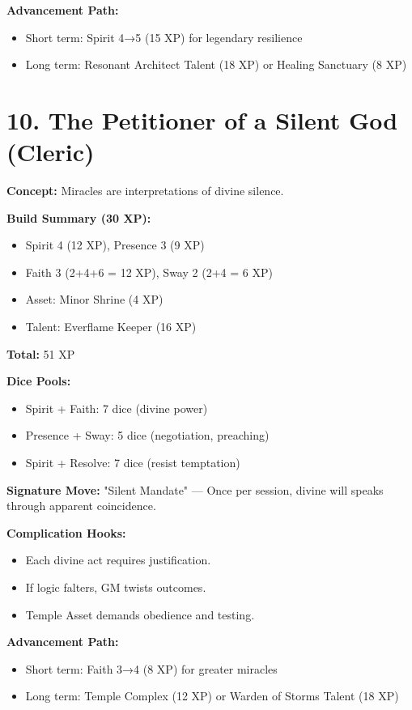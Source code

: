 \textbf{Advancement Path:}
\begin{itemize}
  \item Short term: Spirit 4→5 (15 XP) for legendary resilience
  \item Long term: Resonant Architect Talent (18 XP) or Healing Sanctuary (8 XP)
\end{itemize}

\section{10. The Petitioner of a Silent God (Cleric)}

\textbf{Concept:} Miracles are interpretations of divine silence.

\textbf{Build Summary (30 XP):}
\begin{itemize}
  \item Spirit 4 (12 XP), Presence 3 (9 XP)
  \item Faith 3 (2+4+6 = 12 XP), Sway 2 (2+4 = 6 XP)
  \item Asset: Minor Shrine (4 XP)
  \item Talent: Everflame Keeper (16 XP)
\end{itemize}
\textbf{Total:} 51 XP

\textbf{Dice Pools:}
\begin{itemize}
  \item Spirit + Faith: 7 dice (divine power)
  \item Presence + Sway: 5 dice (negotiation, preaching)
  \item Spirit + Resolve: 7 dice (resist temptation)
\end{itemize}

\textbf{Signature Move:} "Silent Mandate" — Once per session, divine will speaks through apparent coincidence.

\textbf{Complication Hooks:}
\begin{itemize}
  \item Each divine act requires justification.
  \item If logic falters, GM twists outcomes.
  \item Temple Asset demands obedience and testing.
\end{itemize}

\textbf{Advancement Path:}
\begin{itemize}
  \item Short term: Faith 3→4 (8 XP) for greater miracles
  \item Long term: Temple Complex (12 XP) or Warden of Storms Talent (18 XP)
\end{itemize}

